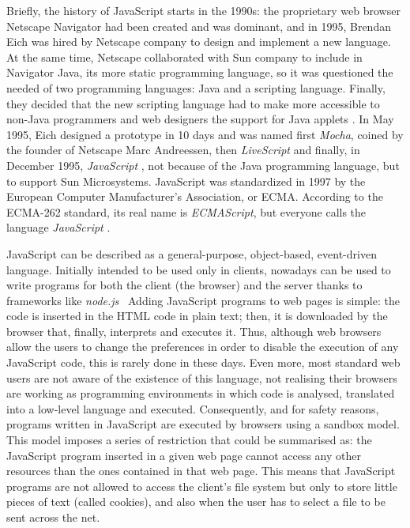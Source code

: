 \documentclass{article}
\begin{document}
Briefly, the history of JavaScript starts in the 1990s: the proprietary web browser Netscape Navigator had been created and was dominant, and in 1995, Brendan Eich was hired by Netscape company to design and implement a new language. At the same time, Netscape collaborated with Sun company to include in Navigator Java, its more static programming language, so it was questioned the needed of two programming languages: Java and a scripting language. Finally, they decided that the new scripting language had to make more accessible to non-Java programmers and web designers the support for Java applets \cite{Champeon08}. In May 1995, Eich designed a prototype in 10 days and was named first \emph{Mocha}, coined by the founder of Netscape Marc Andreessen, then \emph{LiveScript} and finally, in December 1995, \emph{JavaScript} \cite{Eich2010}, not because of the Java programming language, but to support Sun Microsystems.
JavaScript was standardized in 1997 by the European Computer Manufacturer's Association, or ECMA. According to the ECMA-262 standard, its real name is \emph{ECMAScript}, but everyone calls the language \emph{JavaScript} \cite{Flanagan06}.





JavaScript can be described as a general-purpose, object-based, event-driven language. Initially intended to be used only in clients, nowadays can be used to write programs for both the client (the browser) and the server thanks to frameworks like \emph{node.js}~\cite{rauch2012smashing}
Adding JavaScript programs to web pages is simple: the code is inserted in the HTML code in plain text; then, it is downloaded by the browser that, finally,  interprets and executes it.
Thus, although web browsers allow the users to change the preferences
in order to disable the execution of any JavaScript code, this is
rarely done in these days. Even more, most standard web users are not
aware of the existence of this language, not realising their browsers
are working as programming environments in which code is analysed,
translated into a low-level language and executed. Consequently, and
for safety reasons, programs written in JavaScript are executed by
browsers using a sandbox model. This model imposes a series of
restriction that could be summarised as: the JavaScript program
inserted in a given web page cannot access any other resources than
the ones contained in that web page. This means that JavaScript programs are not allowed
to access the client's file system but only to store little pieces of text (called
cookies), and also when the user has to select a file to be sent
across the net.
\end{document}
